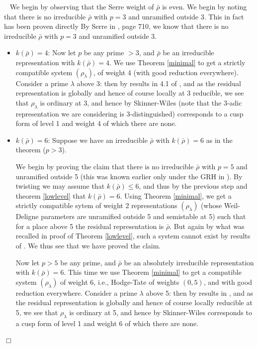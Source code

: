 \documentclass[12pt]{article}
\newcommand{\rhobar}{\overline{\rho}}
\newenvironment{proof}{\smallskip\noindent{\bf Proof.}\
}{$\Box$\smallskip\goodbreak}
\def\rhobar{ {\bar {\rho} } }
\def\rhob{ {\bar {\rho} } }
\begin{document}
\begin{proof} We begin by observing that the Serre weight of $\rhob$  is
even. We begin by noting that there is no irreducible
$\rhob$ with $p=3$ and unramified outside 3. This in fact has been proven
directly By Serre in \cite{Serre2}, page 710,
we know   that there is no irreducible
$\rhob$ with $p=3$ and unramified outside 3.



\begin{itemize}

\item $k(\rhob)=4$:
Now let $p$ be any prime $>3$, and $\rhob$ be an irreducible
representation with $k(\rhob)=4$.
We use Theorem \ref{minimal} to get a strictly compatible system
$(\rho_\lambda)$, of weight 4 (with good reduction everywhere).
Consider a prime $\lambda$ above 3: then by
results in 4.1 of \cite{BLZ}, and as the residual
representation is
globally and hence of course locally at 3 reducible, we see that
$\rho_\lambda$ is ordinary at 3, and hence by Skinner-Wiles \cite{SW2} (note
that
the 3-adic representation we are considering is 3-distinguished) corresponds
to a cusp form of level 1 and weight 4 of which there are none.

\item $k(\rhob)=6$: Suppose we have an irreducible $\rhob$ with
$k(\rhob)=6$ as in the theorem ($p>3$).

We begin by proving the claim that there is no irreducible
$\rhob$ with $p=5$ and unramified outside 5 (this was known earlier only
under
the GRH in \cite{Brue}). By twisting we may assume
that $k(\rhobar) \leq 6$, and thus by 
     the previous step and theorem \ref{lowlevel} that $k(\rhobar)=6$.
Using Theorem
\ref{minimal}, we get a strictly compatible sytem of weight 2
representations $(\rho_\lambda)$ (whose Weil-Deligne parameters are
unramified
outside 5 and semistable at 5)
such that for a place above 5 the residual representation is
$\rhob$. But again by what was recalled in proof of
Theorem \ref{lowlevel}, such a system cannot exist by results of
\cite{Schoof1}.
We thus see that we have proved the claim.

Now let $p>5$ be any prime, and $\rhob$ be an absolutely irreducible 
representation with $k(\rhob)=6$. This time we use Theorem \ref{minimal} to get a
compatible system $(\rho_\lambda)$ of weight 6, i.e., Hodge-Tate of
weights
$(0,5)$, and with good reduction everywhere.
Consider a prime $\lambda$ above 5: then by results in \cite{BLZ},
and as the residual representation is globally and hence of course locally
reducible at 5, we see that
$\rho_\lambda$ is ordinary at 5, and hence by Skinner-Wiles \cite{SW2}
corresponds
to a cusp form of level 1 and weight 6 of which there are none.



\end{itemize}
\end{proof}
\end{document}
